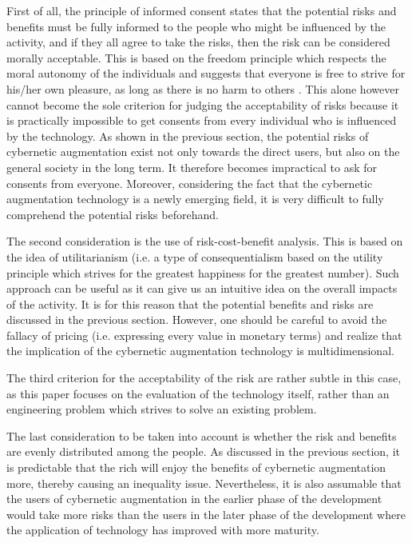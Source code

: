First of all, the principle of informed consent states that the potential risks and benefits must be fully informed to the people who might be influenced by the activity, and if they all agree to take the risks, then the risk can be considered morally acceptable. This is based on the freedom principle which respects the moral autonomy of the individuals and suggests that everyone is free to strive for his/her own pleasure, as long as there is no harm to others \cite{Ethics_textbook}. This alone however cannot become the sole criterion for judging the acceptability of risks because it is practically impossible to get consents from every individual who is influenced by the technology. As shown in the previous section, the potential risks of cybernetic augmentation exist not only towards the direct users, but also on the general society in the long term. It therefore becomes impractical to ask for consents from everyone. Moreover, considering the fact that the cybernetic augmentation technology is a newly emerging field, it is very difficult to fully comprehend the potential risks beforehand. 

The second consideration is the use of risk-cost-benefit analysis. This is based on the idea of utilitarianism (i.e. a type of consequentialism based on the utility principle which strives for the greatest happiness for the greatest number). Such approach can be useful as it can give us an intuitive idea on the overall impacts of the activity. It is for this reason that the potential benefits and risks are discussed in the previous section. However, one should be careful to avoid the fallacy of pricing (i.e. expressing every value in monetary terms) and realize that the implication of the cybernetic augmentation technology is multidimensional.

The third criterion for the acceptability of the risk are rather subtle in this case, as this paper focuses on the evaluation of the technology itself, rather than an engineering problem which strives to solve an existing problem. 

The last consideration to be taken into account is whether the risk and benefits are evenly distributed among the people. As discussed in the previous section, it is predictable that the rich will enjoy the benefits of cybernetic augmentation more, thereby causing an inequality issue. Nevertheless, it is also assumable that the users of cybernetic augmentation in the earlier phase of the development would take more risks than the users  in the later phase of the development where the application of technology has improved with more maturity.

